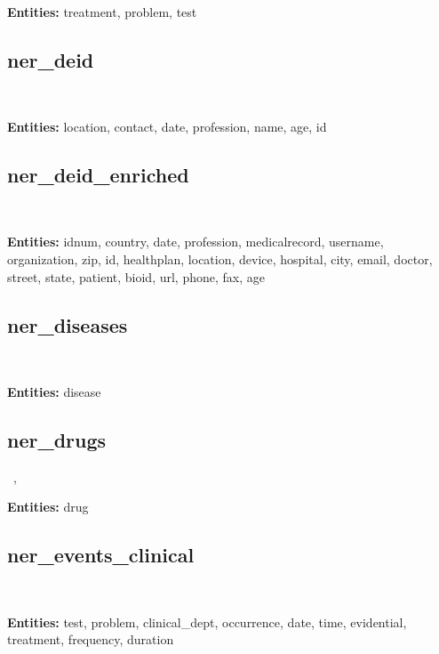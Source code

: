 \documentclass[letterpaper]{article} \usepackage{aaai21}  \usepackage{times}  \usepackage{helvet} \usepackage{courier}  \usepackage[hyphens]{url}  \usepackage{graphicx} \urlstyle{rm} \def\UrlFont{\rm}  \usepackage{natbib}  \usepackage{caption} \frenchspacing  \setlength{\pdfpagewidth}{8.5in}  \setlength{\pdfpageheight}{11in}  \usepackage{lscape}
\begin{document}
~\cite{uzuner20112010}

\textbf{Entities:} treatment, problem, test                                                                                                    

\subsection{ner\_deid}

~\cite{stubbs2015identifying}

\textbf{Entities:} location, contact, date, profession, name, age, id                                                                           

\subsection{ner\_deid\_enriched}

~\cite{stubbs2015identifying}

\textbf{Entities:} idnum, country, date, profession, medicalrecord, username, organization, zip, id, healthplan, location, device, hospital, city, email, doctor, street, state, patient, bioid, url, phone, fax, age                                                     

\subsection{ner\_diseases}

~\cite{dougan2014ncbi}

\textbf{Entities:} disease                                                                              

\subsection{ner\_drugs}

~\cite{henry20202018}, ~\cite{segura2013semeval}

\textbf{Entities:} drug                                                                                                                        

\subsection{ner\_events\_clinical}

~\cite{sun2013evaluating}

\textbf{Entities:} test, problem, clinical\_dept, occurrence, date, time, evidential, treatment, frequency, duration   
\end{document}
